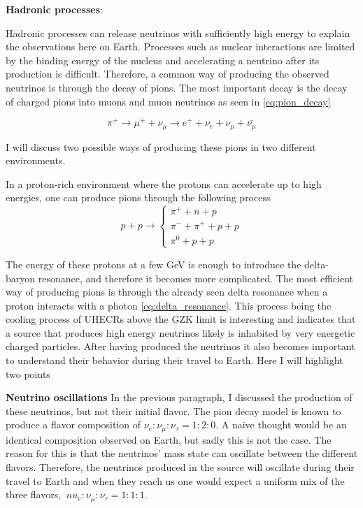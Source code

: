 \textbf{Hadronic processes}:

Hadronic processes can release neutrinos with sufficiently high energy to explain the observations here on Earth. 
Processes such as nuclear interactions are limited by the binding energy of the nucleus and accelerating a neutrino after its production is difficult.
Therefore, a common way of producing the observed neutrinos is through the decay of pions. The most important decay is the decay of charged pions into muons and muon neutrinos as seen in \ref{eq:pion_decay}


\begin{equation}
    \pi^+ \rightarrow \mu^+ + \nu_\mu \rightarrow e^+ + \nu_e + \nu_\mu + \bar{\nu_\mu}
    \label{eq:pion_decay}
\end{equation}

I will discuss two possible ways of producing these pions in two different environments. 


In a proton-rich environment where the protons can accelerate up to high energies, one can produce pions through the following process
\begin{equation}
    p + p \rightarrow \begin{cases}
        \pi^+ + n+ p \\
        \pi^- + \pi^+ +p + p  \\
        \pi^0 + p+p
    \end{cases}
\end{equation}

The energy of these protons at a few GeV is enough to introduce the delta-baryon resonance, and therefore it becomes more complicated.
The most efficient way of producing pions is through the already seen delta resonance when a proton interacts with a photon \ref{eq:delta_resonance}.
This process being the cooling process of UHECRs above the GZK limit is interesting and indicates that a source that produces high energy neutrinos likely is inhabited by very energetic charged particles. 
After having produced the neutrinos it also becomes important to understand their behavior during their travel to Earth. Here I will highlight two points


\textbf{Neutrino oscillations}
In the previous paragraph, I discussed the production of these neutrinos, but not their initial flavor.
The pion decay model is known to produce a flavor composition of $\nu_e : \nu_\mu : \nu_\tau = 1:2:0$. 
A naive thought would be an identical composition observed on Earth, but sadly this is not the case. 
The reason for this is that the neutrinos' mass state can oscillate between the different flavors. Therefore, the neutrinos produced in the source will oscillate during their travel to Earth and when they reach us one would expect a 
uniform mix of the three flavors, $\ nu_e: \nu_\mu: \nu_\tau = 1:1:1$.

